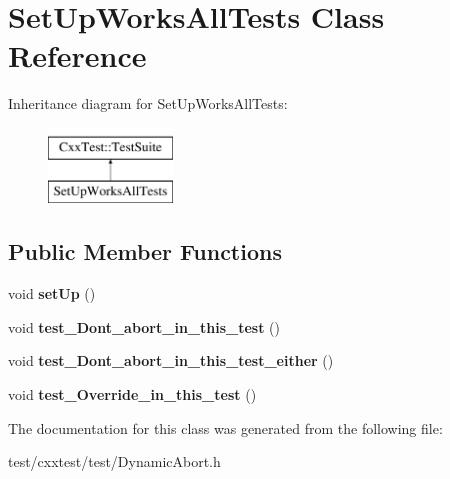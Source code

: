 \hypertarget{classSetUpWorksAllTests}{\section{Set\-Up\-Works\-All\-Tests Class Reference}
\label{classSetUpWorksAllTests}
}
Inheritance diagram for Set\-Up\-Works\-All\-Tests\-:\begin{figure}[H]
\begin{center}
\leavevmode
\includegraphics[height=2.000000cm]{classSetUpWorksAllTests}
\end{center}
\end{figure}
\subsection*{Public Member Functions}
\begin{DoxyCompactItemize}
\item 
\hypertarget{classSetUpWorksAllTests_a6489841f43a5406589c42e983a43c121}{void {\bfseries set\-Up} ()}\label{classSetUpWorksAllTests_a6489841f43a5406589c42e983a43c121}

\item 
\hypertarget{classSetUpWorksAllTests_aa10551fce886135488da2f67564d693d}{void {\bfseries test\-\_\-\-Dont\-\_\-abort\-\_\-in\-\_\-this\-\_\-test} ()}\label{classSetUpWorksAllTests_aa10551fce886135488da2f67564d693d}

\item 
\hypertarget{classSetUpWorksAllTests_aaf6b6256f3807544e4fb81068d79a38e}{void {\bfseries test\-\_\-\-Dont\-\_\-abort\-\_\-in\-\_\-this\-\_\-test\-\_\-either} ()}\label{classSetUpWorksAllTests_aaf6b6256f3807544e4fb81068d79a38e}

\item 
\hypertarget{classSetUpWorksAllTests_aaef2ac05b05271591f2f602ced646c83}{void {\bfseries test\-\_\-\-Override\-\_\-in\-\_\-this\-\_\-test} ()}\label{classSetUpWorksAllTests_aaef2ac05b05271591f2f602ced646c83}

\end{DoxyCompactItemize}


The documentation for this class was generated from the following file\-:\begin{DoxyCompactItemize}
\item 
test/cxxtest/test/Dynamic\-Abort.\-h\end{DoxyCompactItemize}
